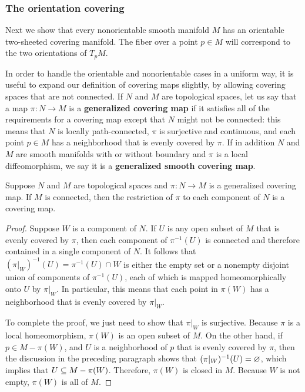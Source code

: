 \subsubsection{The orientation covering}
Next we show that every nonorientable smooth manifold $M$ has an orientable two-sheeted
covering manifold. The fiber over a point $p\in M$ will correspond to the two orientations of $T_pM$.\par
In order to handle the orientable and nonorientable cases in a uniform way, it is useful to expand our definition of covering maps slightly, by allowing covering spaces that are not connected. If $N$ and $M$ are topological spaces, let us say that a map $\pi:N\to M$ is a \textbf{generalized covering map} if it satisfies all of the requirements for a covering map except that $N$ might not be connected: this means that $N$ is locally path-connected, $\pi$ is surjective and continuous, and each point $p\in M$ has a neighborhood that is evenly covered by $\pi$. If in addition $N$ and $M$ are smooth manifolds with or without boundary and $\pi$ is a local diffeomorphism, we say it is a \textbf{generalized smooth covering map}.
\begin{lemma}\label{covering restrict}
Suppose $N$ and $M$ are topological spaces and $\pi:N\to M$ is a generalized covering map. If $M$ is connected, then the restriction of $\pi$ to each component of $N$ is a covering map.
\end{lemma}
\begin{proof}
Suppose $W$ is a component of $N$. If $U$ is any open subset of $M$ that is evenly covered by $\pi$, then each component of $\pi^{-1}(U)$ is connected and therefore contained in a single component of $N$. It follows that $(\pi|_W)^{-1}(U)=\pi^{-1}(U)\cap W$ is either the empty set or a nonempty disjoint union of components of $\pi^{-1}(U)$, each of which is mapped homeomorphically onto $U$ by $\pi|_W$. In particular, this means that each point in $\pi(W)$ has a neighborhood that is evenly covered by $\pi|_W$.\par
To complete the proof, we just need to show that $\pi|_W$ is surjective. Because $\pi$
is a local homeomorphism, $\pi(W)$ is an open subset of $M$. On the other hand, if $p\in M-\pi(W)$, and $U$ is a neighborhood of $p$ that is evenly covered by $\pi$, then the discussion in the preceding paragraph shows that $(\pi|_W)^{-1}(U)=\varnothing$, which implies that $U\subseteq M-\pi(W)$. Therefore, $\pi(W)$ is closed in $M$. Because $W$ is not empty, $\pi(W)$ is all of $M$.
\end{proof}
